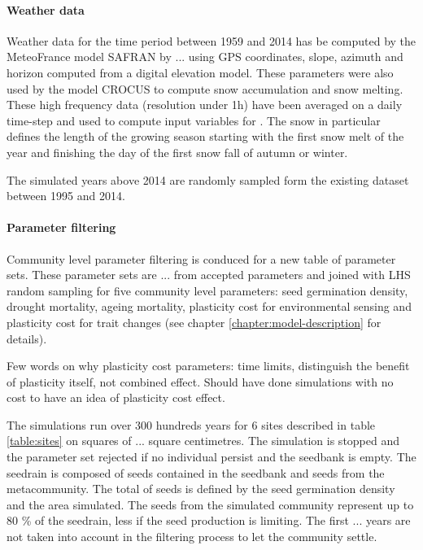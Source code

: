 
\paragraph{Weather data}
Weather data for the time period between 1959 and 2014 has be computed by the MeteoFrance model SAFRAN by ... using GPS coordinates, slope, azimuth and horizon computed from a digital elevation model. These parameters were also used by the model CROCUS to compute snow accumulation and snow melting. These high frequency data (resolution under 1h) have been averaged on a daily time-step and used to compute input variables for \model. The snow in particular defines the length of the growing season starting with the first snow melt of the year and finishing the day of the first snow fall of autumn or winter.

The simulated years above 2014 are randomly sampled form the existing dataset between 1995 and 2014.

\paragraph{Parameter filtering}
Community level parameter filtering is conduced for a new table of parameter sets. These parameter sets are ... from accepted parameters and joined with LHS random sampling for five community level parameters: seed germination density, drought mortality, ageing mortality, plasticity cost for environmental sensing and plasticity cost for trait changes (see chapter \ref{chapter:model-description} for details).

Few words on why plasticity cost parameters: time limits, distinguish the benefit of plasticity itself, not combined effect. Should have done simulations with no cost to have an idea of plasticity cost effect. 

The simulations run over 300 hundreds years for 6 sites described in table \ref{table:sites} on squares of ... square centimetres. The simulation is stopped and the parameter set rejected if no individual persist and the seedbank is empty. The seedrain is composed of seeds contained in the seedbank and seeds from the metacommunity. The total of seeds is defined by the seed germination density and the area simulated. The seeds from the simulated community represent up to 80 \% of the seedrain, less if the seed production is limiting. The first ... years are not taken into account in the filtering process to let the community settle.


